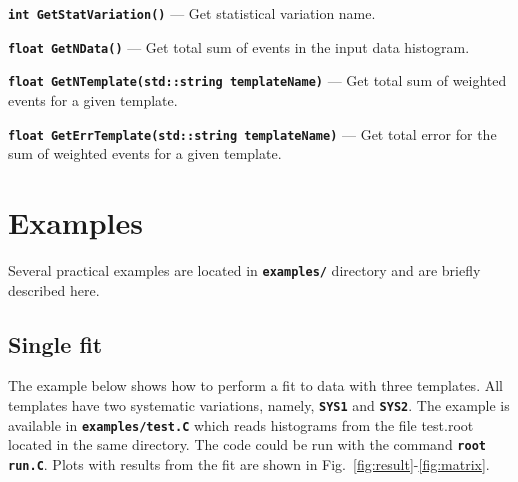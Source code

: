 \documentclass[12pt]{article}
\newcommand\verbbf[1]{\textcolor[rgb]{0,0,1}{\texttt{\textbf{#1}}}}
\newcommand\verbbfb[1]{\textcolor[rgb]{0,0,0}{\texttt{\textbf{#1}}}}
\begin{document}
\vspace{0.3cm}

\noindent \verbbf{int GetStatVariation()} ---
Get statistical variation name.

\vspace{0.3cm}

\noindent \verbbf{float GetNData()} ---
Get total sum of events in the input data histogram.

\vspace{0.3cm}

\noindent \verbbf{float GetNTemplate(std::string templateName)} ---
Get total sum of weighted events for a given template.

\vspace{0.3cm}

\noindent \verbbf{float GetErrTemplate(std::string templateName)} ---
Get total error for the sum of weighted events for a given template.

\section{Examples}

Several practical examples are located in \verbbfb{examples/} directory and are briefly
described here.

\subsection{Single fit}

The example below shows how to perform a fit to data with three
templates. All templates have two systematic variations, namely,
\verbbfb{SYS1} and \verbbfb{SYS2}. The example is available in
\verbbfb{examples/test.C} which reads histograms from the file test.root located
in the same directory. The code could be run with the command \verbbfb{root
run.C}. Plots with results from the fit are shown in
Fig.~\ref{fig:result}-\ref{fig:matrix}.
\end{document}
